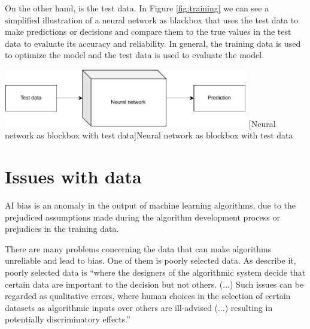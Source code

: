 \documentclass[
	12pt,
    a4paper,
    egregdoesnotlikesansseriftitles, %
    toc=chapterentrywithdots,
    oneside, openany,
    titlepage,
    parskip=half,
    headings=normal,  %
    listof=totoc,
    bibliography=totocnumbered,
    index=totoc,
    captions=tableheading,  %
    listof=flat,
    numbers=noenddot, %
    final]
    {scrbook}
\begin{document}
On the other hand, is the test data. 
In Figure \ref{fig:training} we can see a simplified illustration of a neural network as blackbox that uses the test data to make predictions or decisions and compare them to the true values in the test data to evaluate its accuracy and reliability. 
In general, the training data is used to optimize the model and the test data is used to evaluate the model. \cite[p. 32-33]{khan_guide_2018}



\vspace{1em}
\begin{minipage}{\linewidth}
	\centering
	\includegraphics[width=0.8\textwidth]{figures/test.pdf}
	[Neural network as blockbox with test data]{Neural network as blockbox with test data}
	\label{fig:test}
\end{minipage}



\chapter{Issues with data}
AI bias is an anomaly in the output of machine learning algorithms, due to the prejudiced assumptions made during the algorithm development process or prejudices in the training data.
 
There are many problems concerning the data that can make algorithms unreliable and lead to bias.
One of them is poorly selected data. As \textcite[p. 7]{usa} describe it, poorly selected data is “where the designers of the algorithmic system decide that certain data are important to the decision but not others. (...) Such issues can be regarded as qualitative errors, where human choices in the selection of certain datasets as algorithmic inputs over others are ill-advised (...) resulting in potentially discriminatory effects.”
\end{document}
